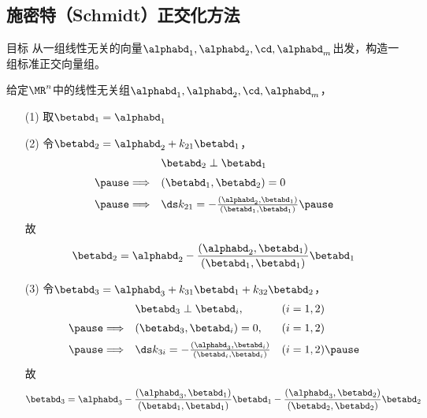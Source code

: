 \subsection{施密特（Schmidt）正交化方法}

\begin{frame}  
  \begin{block}{目标}
    从一组线性无关的向量$\alphabd_1,\alphabd_2,\cd,\alphabd_m$出发，构造一组标准正交向量组。
  \end{block}
\end{frame}


\begin{frame}
  
  \begin{center}
  \end{center}

  给定$\MR^n$中的线性无关组$\alphabd_1,\alphabd_2,\cd,\alphabd_m$， \pause
  \begin{itemize}
  \item[(1)] 取$\betabd_1=\alphabd_1$\pause
  \item[(2)] 令$\betabd_2=\alphabd_2+k_{21}\betabd_1$，\pause
    $$
    \begin{array}{rl}
      &\betabd_2\perp\betabd_1\\[0.2cm]\pause
      \Longrightarrow&(\betabd_1,\betabd_2)=0\\[0.2cm] \pause
      \Longrightarrow& \ds k_{21}=-\frac{(\alphabd_2,\betabd_1)}{(\betabd_1,\betabd_1)} \pause
    \end{array}
    $$
    故
    $$
    \betabd_2=\alphabd_2-\frac{(\alphabd_2,\betabd_1)}{(\betabd_1,\betabd_1)}\betabd_1
    $$
  \end{itemize}
\end{frame}


\begin{frame}
  \begin{center}
  \end{center}  

  \begin{itemize}
  \item[(3)] 令$\betabd_3=\alphabd_3+k_{31}\betabd_1+k_{32}\betabd_2$，\pause
    $$
    \begin{array}{rll}
      &\betabd_3\perp\betabd_i, & (i=1,2)\\[0.2cm] \pause
      \Longrightarrow&(\betabd_3,\betabd_i)=0, & (i=1,2)\\[0.2cm] \pause
      \Longrightarrow& \ds k_{3i}=-\frac{(\alphabd_3,\betabd_i)}{(\betabd_i,\betabd_i)} & (i=1,2) \pause
    \end{array}
    $$
    故
    $$
    \betabd_3=\alphabd_3-\frac{(\alphabd_3,\betabd_1)}{(\betabd_1,\betabd_1)}\betabd_1
    -\frac{(\alphabd_3,\betabd_2)}{(\betabd_2,\betabd_2)}\betabd_2
    $$
  \end{itemize} 
\end{frame}


